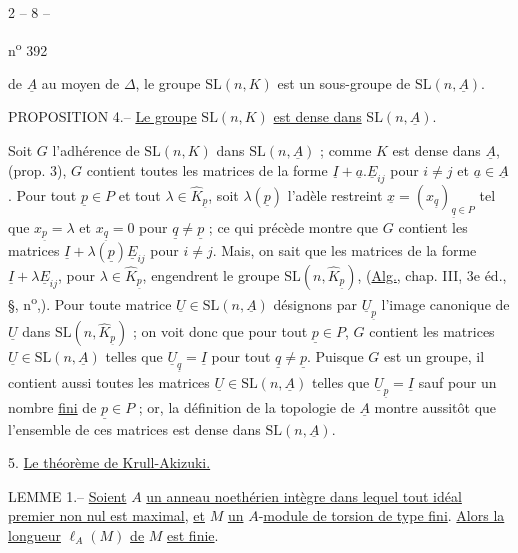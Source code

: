 \begin{center}2 -- 8 --\end{center}
\begin{flushright}n\textsuperscript{o} 392\end{flushright}

de $\underline A$ au moyen de $\Delta$, le groupe $\mathrm{SL}(n,K)$ est un sous-groupe de $\mathrm{SL}(n,\underline A)$.

PROPOSITION 4.-- \uline{Le groupe} $\mathrm{SL}(n,K)$ \uline{est dense dans} $\mathrm{SL}(n,\underline A)$.

Soit $G$ l'adhérence de $\mathrm{SL}(n,K)$ dans $\mathrm{SL}(n,\underline A)$ ; comme $K$ est dense dans $\underline A$, (prop. 3), $G$ contient toutes les matrices de la forme $\underline I+\underline a.\underline E_{ij}$ pour $i\ne j$ et $\underline a\in\underline A$. Pour tout $\underline p\in P$ et tout $\lambda\in\widehat K_{\underline p}$, soit $\lambda(\underline p)$ l'adèle restreint $\underline x=(x_{\underline q})_{\underline q\in P}$ tel que $x_{\underline p}=\lambda$ et $x_{\underline q}=0$ pour $\underline q\ne\underline p$ ; ce qui précède montre que $G$ contient les matrices $\underline I+\lambda(\underline p)\underline E_{ij}$ pour $i\ne j$. Mais, on sait que les matrices de la forme $\underline I+\lambda\underline E_{ij}$, pour $\lambda\in\widehat K_{\underline p}$, engendrent le groupe $\mathrm{SL}(n,\widehat K_{\underline p})$, (\uline{Alg.}, chap. III, 3e éd., \S\quad, n\textsuperscript{o}\quad,\quad). Pour toute matrice $\underline U\in\mathrm{SL}(n,\underline A)$ désignons par $\underline U_{\underline p}$ l'image canonique de $\underline U$ dans $\mathrm{SL}(n,\widehat K_{\underline p})$ ; on voit donc que pour tout $\underline p\in P$, $G$ contient les matrices $\underline U\in\mathrm{SL}(n,\underline A)$ telles que $\underline U_{\underline q}=\underline I$ pour tout $\underline q\ne\underline p$. Puisque $G$ est un groupe, il contient aussi toutes les matrices $\underline U\in\mathrm{SL}(n,\underline A)$ telles que $\underline U_{\underline p}=\underline I$ sauf pour un nombre \uline{fini} de $\underline p\in P$ ; or, la définition de la topologie de $\underline A$ montre aussitôt que l'ensemble de ces matrices est dense dans $\mathrm{SL}(n,\underline A)$.

5. \uline{Le théorème de Krull-Akizuki.}

LEMME 1.-- \uline{Soient} $A$ \uline{un anneau noethérien intègre dans lequel tout idéal premier non nul est maximal}, \uline{et} $M$ \uline{un} $A$-\uline{module de torsion de type fini}. \uline{Alors la longueur} $\ell_A(M)$ \uline{de} $M$ \uline{est finie}.


